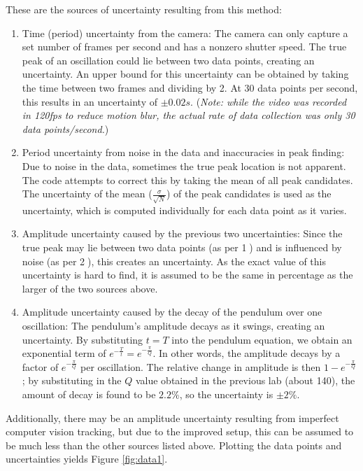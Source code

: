 \documentclass[aps,twocolumn,secnumarabic,nobalancelastpage,amsmath,amssymb,nofootinbib,floatfix]{revtex4}
\begin{document}
These are the sources of uncertainty resulting from this method:
\begin{enumerate}
    \item Time (period) uncertainty from the camera: The camera can only capture a set number of frames per second and
          has a nonzero shutter speed. The true peak of an oscillation could lie between two data points, creating an
          uncertainty. An upper bound for this uncertainty can be obtained by taking the time between two frames and
          dividing by 2. At 30 data points per second, this results in an uncertainty of \(\pm 0.02\si{s}\).
          (\textit{Note: while the video was recorded in 120fps to reduce motion blur, the actual rate of data
          collection was only 30 data points/second.})
    \item Period uncertainty from noise in the data and inaccuracies in peak finding: Due to noise in the data,
          sometimes the true peak location is not apparent. The code attempts to correct this by taking the mean of all
          peak candidates. The uncertainty of the mean ($\frac{\sigma}{\sqrt{N}}$) of the peak candidates is used as the
          uncertainty, which is computed individually for each data point as it varies.
    \item Amplitude uncertainty caused by the previous two uncertainties: Since the true peak may lie between two data
          points (as per \textcircled{1}) and is influenced by noise (as per \textcircled{2}), this creates an
          uncertainty. As the exact value of this uncertainty is hard to find, it is assumed to be the same in
          percentage as the larger of the two sources above.
    \item Amplitude uncertainty caused by the decay of the pendulum over one oscillation: The pendulum's amplitude
          decays as it swings, creating an uncertainty. By substituting $t = T$ into the pendulum equation, we obtain
          an exponential term of $e^{-\frac{T}{t}} = e^{-\frac{\pi}{Q}}$. In other words, the amplitude decays by a
          factor of $e^{-\frac{\pi}{Q}}$ per oscillation. The relative change in amplitude is then
          $1 - e^{-\frac{\pi}{Q}}$; by substituting in the $Q$ value obtained in the previous lab (about 140), the
          amount of decay is found to be $2.2\%$, so the uncertainty is \(\pm 2\%\).
\end{enumerate}

Additionally, there may be an amplitude uncertainty resulting from imperfect computer vision tracking, but due to the
improved setup, this can be assumed to be much less than the other sources listed above. Plotting the data points and
uncertainties yields Figure \ref{fig:data1}.
\end{document}
